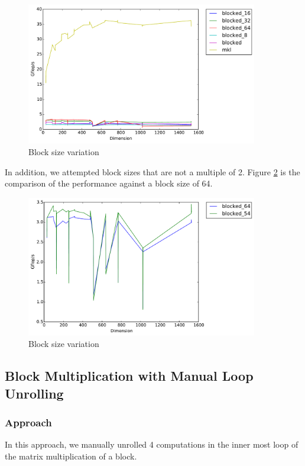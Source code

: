\documentclass[11pt]{article}
\theoremstyle{plain}
\theoremstyle{definition}
\begin{document}
\begin{figure}[H]
    \includegraphics[width=0.9\textwidth]{timing_block_size_changes.pdf}
    \caption{Block size variation}
    \label{pow_2_blocks}
\end{figure} 

In addition, we attempted block sizes that are not a multiple of 2. Figure \ref{odd_blocks} is the comparison of the performance against a block size of 64.\\
\begin{figure}[H]
    \includegraphics[width=0.9\textwidth]{timing_54_64.pdf}
    \caption{Block size variation}
    \label{odd_blocks}
\end{figure} 


\subsection{Block Multiplication with Manual Loop Unrolling}
\subsubsection{Approach}
In this approach, we manually unrolled 4 computations in the inner most loop of the matrix multiplication of a block. 
\end{document}
